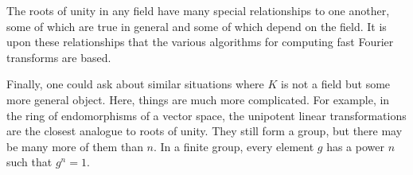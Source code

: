 \documentclass[12pt]{article}
\begin{document}
The roots of unity in any field have many special relationships to one
another, some of which are true in general and some of which depend on
the field.  It is upon these relationships that the various algorithms
for computing fast Fourier transforms are based.

Finally, one could ask about similar situations where $K$ is not a
field but some more general object.  Here, things are much more
complicated.  For example, in the ring of endomorphisms of a vector
space, the unipotent linear transformations are the closest analogue
to roots of unity.  They still form a group, but there may be many
more of them than $n$.  In a finite group, every element $g$ has a
power $n$ such that $g^n=1$.

\end{document}
